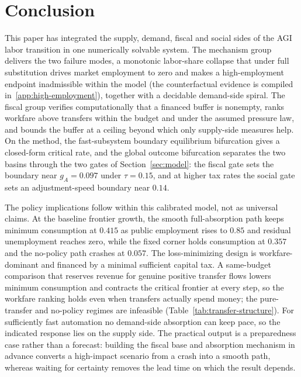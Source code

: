 \documentclass[review,12pt]{elsarticle}
\theoremstyle{plain}
\theoremstyle{definition}
\theoremstyle{remark}
\begin{document}
\section{Conclusion}
\label{sec:conclusion}
This paper has integrated the supply, demand, fiscal and social sides of the AGI labor transition in one numerically solvable system. The mechanism group delivers the two failure modes, a monotonic labor-share collapse that under full substitution drives market employment to zero and makes a high-employment endpoint inadmissible within the model (the counterfactual evidence is compiled in~\ref{app:high-employment}), together with a decidable demand-side spiral. The fiscal group verifies computationally that a financed buffer is nonempty, ranks workfare above transfers within the budget and under the assumed pressure law, and bounds the buffer at a ceiling beyond which only supply-side measures help. On the method, the fast-subsystem boundary equilibrium bifurcation gives a closed-form critical rate, and the global outcome bifurcation separates the two basins through the two gates of Section~\ref{sec:model}: the fiscal gate sets the boundary near $g_A=0.097$ under $\tau=0.15$, and at higher tax rates the social gate sets an adjustment-speed boundary near $0.14$.

The policy implications follow within this calibrated model, not as universal claims. At the baseline frontier growth, the smooth full-absorption path keeps minimum consumption at $0.415$ as public employment rises to $0.85$ and residual unemployment reaches zero, while the fixed corner holds consumption at $0.357$ and the no-policy path crashes at $0.057$. The loss-minimizing design is workfare-dominant and financed by a minimal sufficient capital tax. A same-budget comparison that reserves revenue for genuine positive transfer flows lowers minimum consumption and contracts the critical frontier at every step, so the workfare ranking holds even when transfers actually spend money; the pure-transfer and no-policy regimes are infeasible (Table~\ref{tab:transfer-structure}). For sufficiently fast automation no demand-side absorption can keep pace, so the indicated response lies on the supply side. The practical output is a preparedness case rather than a forecast: building the fiscal base and absorption mechanism in advance converts a high-impact scenario from a crash into a smooth path, whereas waiting for certainty removes the lead time on which the result depends.
\end{document}
